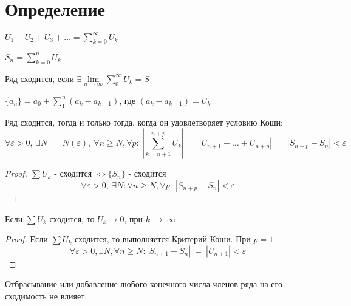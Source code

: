 \section{Определение}

\begin{definition}
  $U_1 + U_2 + U_3 + \dots = \sum\limits_{k = 0}^{\infty}{U_k}$
\end{definition}

\begin{definition}
  $S_n = \sum\limits_{k = 0}^n U_k$
\end{definition}

\begin{definition}
  Ряд сходится, если $\exists \lim\limits_{n \to \infty}
                      \sum\limits_0^\infty U_k = S$
\end{definition}

\begin{definition}
  $\{a_n\} = a_0 + \sum\limits_1^n (a_k - a_{k-1})$, где $(a_k - a_{k - 1}) = U_k$
\end{definition}

\begin{theorem}
  \label{th111}
  Ряд сходится, тогда и только тогда, когда он удовлетворяет условию Коши: \\
  $$\forall \varepsilon > 0, \ \exists N~=~N(\varepsilon), \
  \forall n \geq N, \forall p: \ |\sum\limits_{k=n+1}^{n+p} U_k|~=~|U_{n+1}
  + \dots + U_{n+p}|~=~|S_{n+p} - S_{n}| < \varepsilon$$
\end{theorem}

\begin{proof}
  $\sum U_k$ - сходится $\Leftrightarrow \{S_n\}$ - сходится
  $$\forall \varepsilon > 0, \ \exists N: \forall n \geq N, \forall p: \
  |S_{n+p} - S_{n}| < \varepsilon$$
\end{proof}
\begin{consequence}
  Если $\sum U_k$ сходится, то $U_k \to 0$, при $k~\to~\infty$
\end{consequence}
\begin{proof}
  Если $\sum U_k$ сходится, то выполняется Критерий Коши. При $p = 1$
  $$\forall \varepsilon > 0, \exists N, \forall n \geq N:
  |S_{n+1} - S_n|~=~|U_{n+1}| < \varepsilon$$
\end{proof}
\begin{consequence}
  Отбрасывание или добавление любого конечного числа членов ряда на его
  сходимость не влияет.
\end{consequence}

